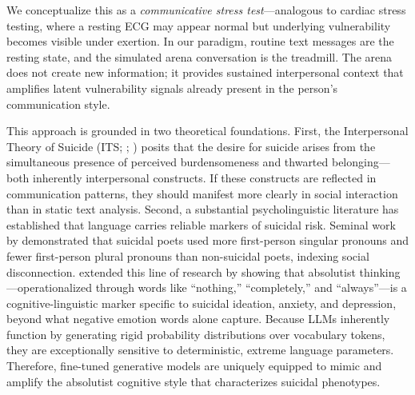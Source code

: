 \documentclass[review,12pt,authoryear]{elsarticle}
\begin{document}
We conceptualize this as a \textit{communicative stress test}---analogous to cardiac stress testing, where a resting ECG may appear normal but underlying vulnerability becomes visible under exertion. In our paradigm, routine text messages are the resting state, and the simulated arena conversation is the treadmill. The arena does not create new information; it provides sustained interpersonal context that amplifies latent vulnerability signals already present in the person's communication style.

This approach is grounded in two theoretical foundations. First, the Interpersonal Theory of Suicide (ITS; \citealt{joiner2005why}; \citealt{vanorden2010interpersonal}) posits that the desire for suicide arises from the simultaneous presence of perceived burdensomeness and thwarted belonging---both inherently interpersonal constructs. If these constructs are reflected in communication patterns, they should manifest more clearly in social interaction than in static text analysis. Second, a substantial psycholinguistic literature has established that language carries reliable markers of suicidal risk. Seminal work by \citet{stirman2001word} demonstrated that suicidal poets used more first-person singular pronouns and fewer first-person plural pronouns than non-suicidal poets, indexing social disconnection. \citet{almosaiwi2018absolute} extended this line of research by showing that absolutist thinking---operationalized through words like ``nothing,'' ``completely,'' and ``always''---is a cognitive-linguistic marker specific to suicidal ideation, anxiety, and depression, beyond what negative emotion words alone capture. Because LLMs inherently function by generating rigid probability distributions over vocabulary tokens, they are exceptionally sensitive to deterministic, extreme language parameters. Therefore, fine-tuned generative models are uniquely equipped to mimic and amplify the absolutist cognitive style that characterizes suicidal phenotypes. 
\end{document}
